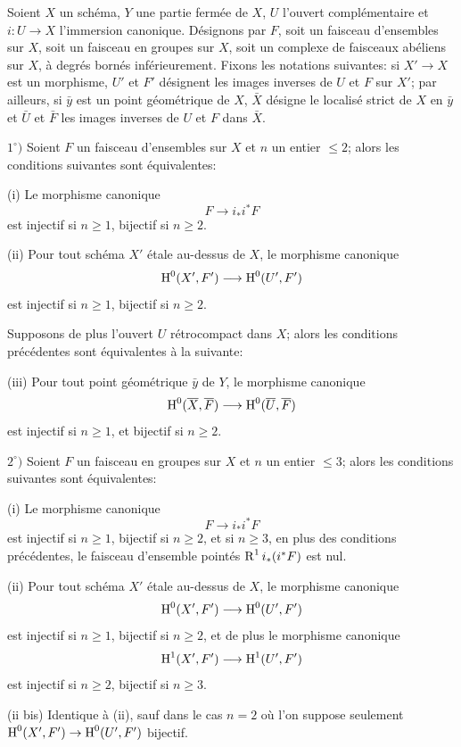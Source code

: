 \enlargethispage{\baselineskip}%
\begin{proposition} \label{XIV.1.1}
Soient $X$ un sch\'ema, $Y$ une partie ferm\'ee de $X$, $U$ l'ouvert compl\'ementaire et $i:U\to X$ l'immersion canonique. D\'esignons par $F$, soit un faisceau d'ensembles sur $X$, soit un faisceau en groupes sur $X$, soit un complexe de faisceaux ab\'eliens sur $X$, \`a degr\'es born\'es inf\'erieurement. Fixons les notations suivantes: si $X'\to X$ est un morphisme, $U'$ et $F'$ d\'esignent les images inverses de $U$ et $F$ sur $X'$; par ailleurs, si $\bar{y}$ est un point g\'eom\'etrique de $X$, $\bar{X}$ d\'esigne le localis\'e strict de $X$ en $\bar{y}$ et $\bar{U}$ et $\bar{F}$ les images inverses de $U$ et $F$ dans $\bar{X}$.

$1^\circ)$ Soient $F$ un faisceau d'ensembles sur $X$ et $n$ un entier $\leq 2$; alors les conditions suivantes sont \'equivalentes:

\textup{(i)} Le morphisme canonique
$$F\to i_*i^*F$$
est injectif si $n\geq 1$, bijectif si $n\geq 2$.

\textup{(ii)} Pour tout sch\'ema $X'$ \'etale au-dessus de $X$, le morphisme canonique
$$
\H^0(X', F')\to \H^0(U', F')
$$
est injectif si $n\geq 1$, bijectif si $n\geq 2$.

Supposons de plus l'ouvert $U$ r\'etrocompact dans $X$; alors les conditions pr\'ec\'edentes sont \'equivalentes \`a la suivante:

\textup{(iii)} Pour tout point g\'eom\'etrique $\bar{y}$ de $Y$, le morphisme canonique
$$
\H^0(\bar{X}, \bar{F})\to \H^0(\bar{U}, \bar{F})$$
est injectif si $n\geq 1$, et bijectif si $n\geq 2$.

$2^\circ)$ Soient $F$ un faisceau en groupes sur $X$ et $n$ un entier $\leq 3$; alors les conditions suivantes sont \'equivalentes:

\textup{(i)} Le morphisme canonique
$$F\to i_*i^*F$$
est injectif si $n\geq 1$, bijectif si $n\geq 2$, et si $n\geq 3$, en plus des conditions pr\'ec\'edentes, le faisceau d'ensemble point\'es $\operatorname{R}^1i_*(i^*F)$ est nul.

\textup{(ii)} Pour tout sch\'ema $X'$ \'etale au-dessus de $X$, le morphisme canonique
$$
\H^0(X', F')\to \H^0(U', F')
$$
est injectif si $n\geq 1$, bijectif si $n\geq 2$, et de plus le morphisme canonique
$$
\H^1(X', F')\to \H^1(U', F')
$$
est injectif si $n\geq 2$, bijectif si $n\geq 3$.

\textup{(ii bis)} Identique \`a \textup{(ii)}, sauf dans le cas $n=2$ o\`u l'on suppose seulement $\H^0(X', F')\to \H^0(U', F')$ bijectif.


\end{proposition}
